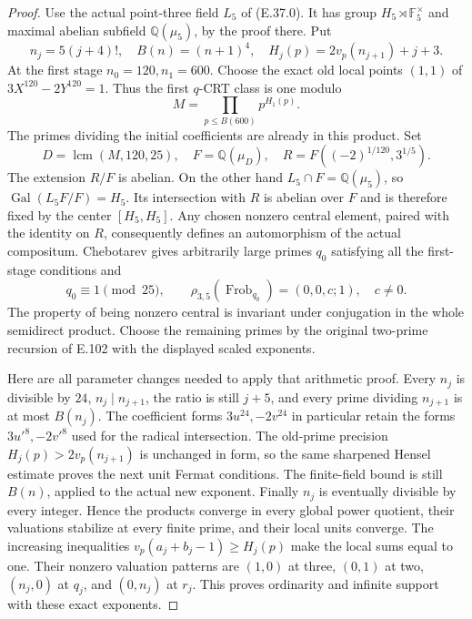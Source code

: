 \begin{proof}
Use the actual point-three field $L_5$ of (E.37.0).
It has group $H_5\rtimes\mathbb F_5^\times$ and maximal
abelian subfield $\mathbb Q(\mu_5)$, by the proof there.
Put
\[
 n_j=5(j+4)!,\quad
 B(n)=(n+1)^4,\quad
 H_j(p)=2v_p(n_{j+1})+j+3 .
\]
At the first stage $n_0=120,n_1=600$. Choose the exact
old local points $(1,1)$ of $3X^{120}-2Y^{120}=1$.
Thus the first $q$-CRT class is one modulo
\[
 M=\prod_{p\leq B(600)}p^{H_1(p)} .
\]
The primes dividing the initial coefficients are already
in this product. Set
\[
 D=\operatorname{lcm}(M,120,25),\quad
 F=\mathbb Q(\mu_D),\quad
 R=F((-2)^{1/120},3^{1/5}).
\]
The extension $R/F$ is abelian. On the other hand
$L_5\cap F=\mathbb Q(\mu_5)$, so
$\operatorname{Gal}(L_5F/F)=H_5$.
Its intersection with $R$ is abelian over $F$ and
is therefore fixed by the center
$[H_5,H_5]$. Any chosen nonzero central element,
paired with the identity on $R$, consequently defines
an automorphism of the actual compositum.
Chebotarev \cite[8.31, p.147]{CohMilneANT} gives
arbitrarily large primes $q_0$ satisfying all the
first-stage conditions and
\[
 q_0\equiv1\pmod{25},\qquad
 \rho_{3,5}(\operatorname{Frob}_{q_0})
                  =(0,0,c;1),\quad c\ne0.
 \tag{E.60.1}
\]
The property of being nonzero central is invariant
under conjugation in the whole semidirect product.
Choose the remaining primes by the original two-prime
recursion of E.102 with the displayed scaled exponents.

Here are all parameter changes needed to apply that
arithmetic proof. Every $n_j$ is divisible by $24$,
$n_j\mid n_{j+1}$, the ratio is still $j+5$, and
every prime dividing $n_{j+1}$ is at most $B(n_j)$.
The coefficient forms $3u^{24},-2v^{24}$ in particular
retain the forms $3u'^8,-2v'^8$ used for the radical
intersection. The old-prime precision
$H_j(p)>2v_p(n_{j+1})$ is unchanged in form, so the
same sharpened Hensel estimate proves the next unit
Fermat conditions. The finite-field bound is still
$B(n)$, applied to the actual new exponent.
Finally $n_j$ is eventually divisible by every
integer. Hence the products converge in every global
power quotient, their valuations stabilize at every
finite prime, and their local units converge.
The increasing inequalities
$v_p(a_j+b_j-1)\geq H_j(p)$ make the local sums
equal to one. Their nonzero valuation patterns are
$(1,0)$ at three, $(0,1)$ at two, $(n_j,0)$ at
$q_j$, and $(0,n_j)$ at $r_j$. This proves
ordinarity and infinite support with these exact
exponents.


\end{proof}
